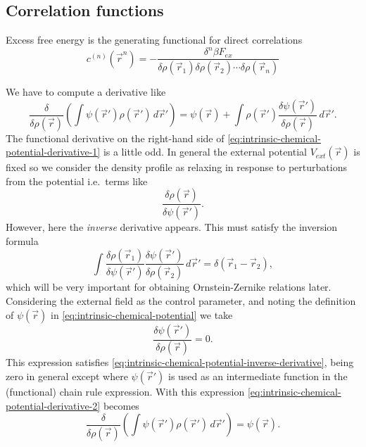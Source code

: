 \documentclass[12pt]{report}
\begin{document}
\subsection{Correlation functions}

Excess free energy is the generating functional for direct correlations
\begin{equation}\label{eq:direct-correlations}
  c^{(n)}(\vec{r}^n) =
  - \frac{\delta^n \beta F_{ex}}{\delta \rho(\vec{r}_1)\delta \rho(\vec{r}_2) \cdots \delta \rho(\vec{r}_n)}
\end{equation}

We have to compute a derivative like
\begin{equation}\label{eq:intrinsic-chemical-potential-derivative-1}
  \frac{\delta}{\delta\rho(\vec{r})}
  \left(
  \int \psi(\vec{r}') \rho(\vec{r}') \, d\vec{r}'
  \right)
  =
  \psi(\vec{r}) +
  \int
  \rho(\vec{r}') \frac{\delta\psi(\vec{r}')}{\delta\rho(\vec{r})}
  \, d\vec{r}'.
\end{equation}
The functional derivative on the right-hand side of \eqref{eq:intrinsic-chemical-potential-derivative-1} is a little odd.
In general the external potential $V_{ext}(\vec{r})$%
is fixed so we consider the density profile as relaxing in response to perturbations from the potential i.e.\ terms like \[ \frac{\delta \rho(\vec{r})}{\delta \psi(\vec{r}')}. \]
However, here the \emph{inverse} derivative appears.
This must satisfy the inversion formula
\begin{equation}\label{eq:intrinsic-chemical-potential-inverse-derivative}
  \int
  \frac{\delta \rho(\vec{r}_1)}{\delta \psi(\vec{r}')}
  \frac{\delta \psi(\vec{r}')}{\delta \rho(\vec{r}_2)}
  \, d\vec{r}' =
  \delta(\vec{r}_1 - \vec{r}_2),
\end{equation}
which will be very important for obtaining Ornstein-Zernike relations later.
Considering the external field as the control parameter, and noting the definition of $\psi(\vec{r})$ in \eqref{eq:intrinsic-chemical-potential} we take
\begin{equation*}
  \frac{\delta\psi(\vec{r}')}{\delta\rho(\vec{r})} = 0.
\end{equation*}
This expression satisfies \eqref{eq:intrinsic-chemical-potential-inverse-derivative}, being zero in general except where $\psi(\vec{r}')$ is used as an intermediate function in the (functional) chain rule expression.
With this expression \eqref{eq:intrinsic-chemical-potential-derivative-2} becomes
\begin{equation}\label{eq:intrinsic-chemical-potential-derivative-2}
  \frac{\delta}{\delta\rho(\vec{r})}
  \left(
  \int \psi(\vec{r}') \rho(\vec{r}') \, d\vec{r}'
  \right)
  =
  \psi(\vec{r}).
\end{equation}
\end{document}
